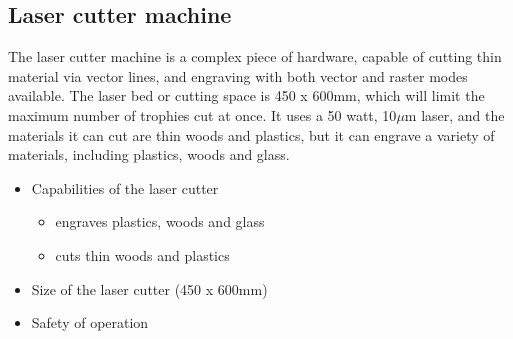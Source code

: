\documentclass[oneside,openany,11pt,a4paper]{report}
\begin{document}
\subsection{Laser cutter machine}
The laser cutter machine is a complex piece of hardware, capable of cutting thin material via vector lines, and engraving with both vector and raster modes available. The laser bed or cutting space is 450 x 600mm, which will limit the maximum number of trophies cut at once. It uses a 50 watt, 10$\mu$m laser, and the materials it can cut are thin woods and plastics, but it can engrave a variety of materials, including plastics, woods and glass. 
\begin{itemize}
	\itemsep0em
	\item Capabilities of the laser cutter
	\begin{itemize}
		\itemsep0em
    	\item engraves plastics, woods and glass
        \item cuts thin woods and plastics
    \end{itemize}

    	\item Size of the laser cutter (450 x 600mm)
    	\item Safety of operation 

\end{itemize}
\end{document}
